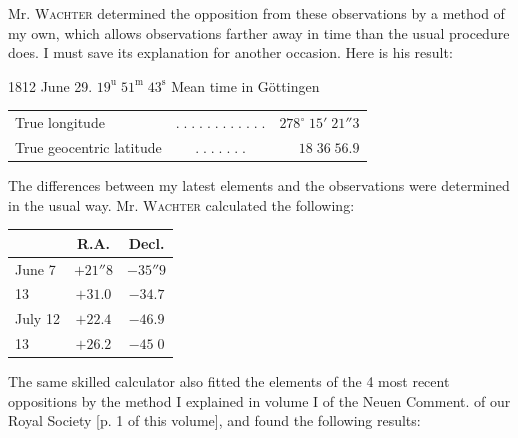 \par\indent Mr. \textsc{Wachter} determined the opposition from these observations by a method of my own, which allows observations farther away in time than the usual procedure does. I must save its explanation for another occasion. Here is his result:

1812 June 29. $19^{\mathrm u}\;51^{\mathrm m}\;43^{\mathrm s}$ Mean time in Göttingen

\begin{center}\fontsize{10}{12}\selectfont\setlength{\tabcolsep}{2pt}\renewcommand{\arraystretch}{1.15}\begin{tabular}{lcr}
True longitude & $.\;.\;.\;.\;.\;.\;.\;.\;.\;.\;.\;.$ & $278^\circ\;15'\;21''3$\\
True geocentric latitude & $.\;.\;.\;.\;.\;.\;.$ & $18\;36\;56.9$\\
\end{tabular}\end{center}

\par\indent The differences between my latest elements and the observations were determined in the usual way. Mr. \textsc{Wachter} calculated the following:

\begin{center}\fontsize{10}{12}\selectfont\setlength{\tabcolsep}{7pt}\renewcommand{\arraystretch}{1.15}\begin{tabular}{l|c|c}
& R.A. & Decl.\\\hline
June 7 & $+21''8$ & $-35''9$\\
13 & $+31.0$ & $-34.7$\\
July 12 & $+22.4$ & $-46.9$\\
13 & $+26.2$ & $-45\;0$\\
\end{tabular}\end{center}

\par\indent The same skilled calculator also fitted the elements of the 4 most recent oppositions by the method I explained in volume I of the Neuen Comment. of our Royal Society [p. 1 of this volume], and found the following results:

